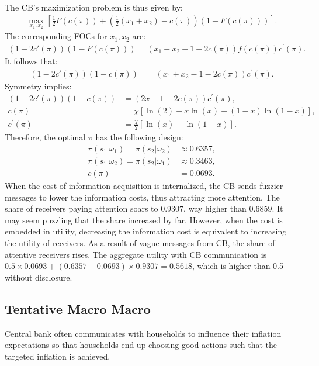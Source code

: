 \documentclass[12pt,a4paper]{article}
\begin{document}
The CB's maximization problem is thus given by:
\begin{align}
    \max_{x_1,x_2} \left[\frac{1}{2}F(c(\pi)) + \left(\frac{1}{2}(x_1+x_2)-c(\pi)\right)(1-F(c(\pi)))\right].
\end{align}
The corresponding FOCs for $x_1,x_2$ are:
\begin{align}
    (1-2c'(\pi))(1-F(c(\pi)))=(x_1+x_2-1-2c(\pi))f(c(\pi))c^\prime(\pi).
\end{align}
It follows that:
\begin{align}
    (1-2c'(\pi))(1-c(\pi)) & = (x_1+x_2-1-2c(\pi))c^\prime(\pi).
\end{align}
Symmetry implies:
\begin{align}
    (1-2c'(\pi))(1-c(\pi)) & = (2x-1-2c(\pi))c^\prime(\pi), \\
    c(\pi) & = \chi[\ln(2)+x\ln(x)+(1-x)\ln(1-x)], \\
    c^\prime(\pi) & = \frac{\chi}{2}[\ln(x)-\ln(1-x)].
\end{align}
Therefore, the optimal $\pi$ has the following design:
\begin{align}
    \pi(s_1|\omega_1) = \pi(s_2|\omega_2) & \approx 0.6357, \\
    \pi(s_1|\omega_2) = \pi(s_2|\omega_1) & \approx 0.3463, \\
    c(\pi) & = 0.0693.
\end{align}
When the cost of information acquisition is internalized, the CB sends fuzzier messages to lower the information costs, thus attracting more attention. The share of receivers paying attention soars to 0.9307, way higher than 0.6859. It may seem puzzling that the share increased by far. However, when the cost is embedded in utility, decreasing the information cost is equivalent to increasing the utility of receivers. As a result of vague messages from CB, the share of attentive receivers rises. The aggregate utility with CB communication is $0.5 \times 0.0693 + (0.6357-0.0693) \times  0.9307 = 0.5618$, which is higher than 0.5 without disclosure. 

\subsection{Tentative Macro Macro}

Central bank often communicates with households to influence their inflation expectations so that households end up choosing good actions such that the targeted inflation is achieved.
\end{document}
